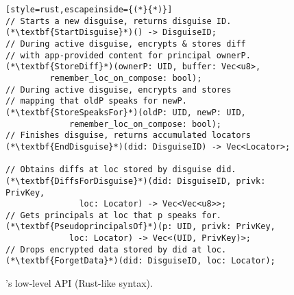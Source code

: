 \begin{figure}[t]
\begin{lstlisting}[style=rust,escapeinside={(*}{*)}]
// Starts a new disguise, returns disguise ID.
(*\textbf{StartDisguise}*)() -> DisguiseID;
// During active disguise, encrypts & stores diff
// with app-provided content for principal ownerP.
(*\textbf{StoreDiff}*)(ownerP: UID, buffer: Vec<u8>,
         remember_loc_on_compose: bool);
// During active disguise, encrypts and stores
// mapping that oldP speaks for newP.
(*\textbf{StoreSpeaksFor}*)(oldP: UID, newP: UID,
             remember_loc_on_compose: bool);
// Finishes disguise, returns accumulated locators
(*\textbf{EndDisguise}*)(did: DisguiseID) -> Vec<Locator>;

// Obtains diffs at loc stored by disguise did.
(*\textbf{DiffsForDisguise}*)(did: DisguiseID, privk: PrivKey,
               loc: Locator) -> Vec<Vec<u8>>;
// Gets principals at loc that p speaks for.
(*\textbf{PseudoprincipalsOf}*)(p: UID, privk: PrivKey,
             loc: Locator) -> Vec<(UID, PrivKey)>;
// Drops encrypted data stored by did at loc.
(*\textbf{ForgetData}*)(did: DisguiseID, loc: Locator);
\end{lstlisting}
\caption{\sys's low-level API (Rust-like syntax).}
\label{f:api-low}
\end{figure}


